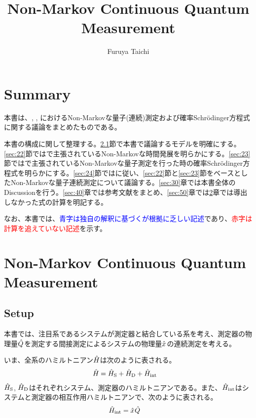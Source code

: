 \documentclass[10pt, a4paper]{jsarticle}
\begin{document}
\title{Non-Markov Continuous Quantum Measurement}
\author{Furuya Taichi}
\date{}
\maketitle

\section{Summary}
\label{sec:10}
本書は、\cite{diosi2008retarted}, \cite{diosi1993master}, \cite{gambetta2002non-markov}におけるNon-Markovな量子(連続)測定および確率Schr\"{o}dinger方程式に関する議論をまとめたものである。

本書の構成に関して整理する。\ref{sec:21}節で本書で議論するモデルを明確にする。\ref{sec:22}節では\cite{diosi2008retarted}で主張されているNon-Markovな時間発展を明らかにする。\ref{sec:23}節では\cite{gambetta2002non-markov}で主張されているNon-Markovな量子測定を行った時の確率Schr\"{o}dinger方程式を明らかにする。\ref{sec:24}節では\cite{diosi2008retarted}に従い、\ref{sec:22}節と\ref{sec:23}節をベースとしたNon-Markovな量子連続測定について議論する。\ref{sec:30}章では本書全体のDiscussionを行う。\ref{sec:40}章では参考文献をまとめ、\ref{sec:50}章では\ref{sec:20}章では導出しなかった式の計算を明記する。

なお、本書では、\textcolor{blue}{青字は独自の解釈に基づくが根拠に乏しい記述}であり、\textcolor{red}{赤字は計算を追えていない記述}を示す。


\section{Non-Markov Continuous Quantum Measurement}
\label{sec:20}

\subsection{Setup}
\label{sec:21}

本書では、注目系であるシステムが測定器と結合している系を考え、測定器の物理量$\hat{Q}_{}$を測定する間接測定によるシステムの物理量$\hat{x}_{}$の連続測定を考える。

いま、全系のハミルトニアン$\hat{H}_{\rm }$は次のように表される。
\begin{equation}
\begin{split}
\label{eq:21}
	\hat{H}_{\rm } &= \hat{H}_{\rm S} + \hat{H}_{\rm D} + \hat{H}_{\rm int}
\end{split}
\end{equation}
$\hat{H}_{\rm S}$, $\hat{H}_{\rm D}$はそれぞれシステム、測定器のハミルトニアンである。また、$\hat{H}_{\rm int}$はシステムと測定器の相互作用ハミルトニアンで、次のように表される。
\begin{equation}
\begin{split}
\label{eq:22}
	\hat{H}_{\rm int} &= \hat{x}_{} \hat{Q}_{}
\end{split}
\end{equation}
\end{document}
